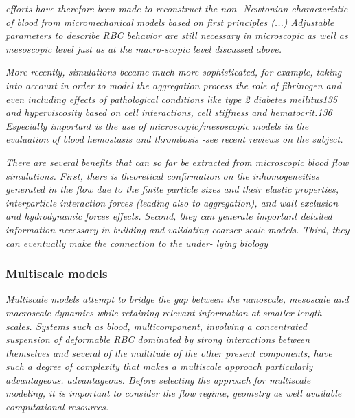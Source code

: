 \documentclass[11pt,letterpaper]{article}
\begin{document}
\textit{efforts have therefore been made to reconstruct the non- Newtonian characteristic of blood from micromechanical models based on first principles (...) 
Adjustable parameters to describe RBC behavior are still necessary
in microscopic as well as mesoscopic level just as at the macro-scopic level discussed above.}


\textit{More recently, simulations became much more sophisticated,
for example, taking into account in order to model the aggregation process the role of fibrinogen and even including effects of pathological conditions like type 2 diabetes mellitus135 and hyperviscosity based on cell interactions, cell stiffness and hematocrit.136 Especially important is the use of microscopic/mesoscopic models in the evaluation of blood hemostasis and thrombosis -see recent reviews on the subject.}



\textit{There are several benefits that can so far be extracted from microscopic blood flow simulations. First, there is theoretical confirmation on the inhomogeneities generated in the flow due to the finite particle sizes and their elastic properties, interparticle interaction forces (leading also to aggregation), and wall exclusion and hydrodynamic forces effects. Second, they can generate important detailed information necessary in building and validating coarser scale models. Third, they can eventually make the connection to the under- lying biology}




\subsubsection*{Multiscale models}


\textit{
Multiscale models attempt to bridge the gap between the
nanoscale, mesoscale and macroscale dynamics while retaining
relevant information at smaller length scales. Systems such as
blood, multicomponent, involving a concentrated suspension
of deformable RBC dominated by strong interactions between
themselves and several of the multitude of the other present
components, have such a degree of complexity that makes a
multiscale approach particularly advantageous.
advantageous. Before selecting
the approach for multiscale modeling, it is important to consider
the flow regime, geometry as well available computational
resources.}
\end{document}
